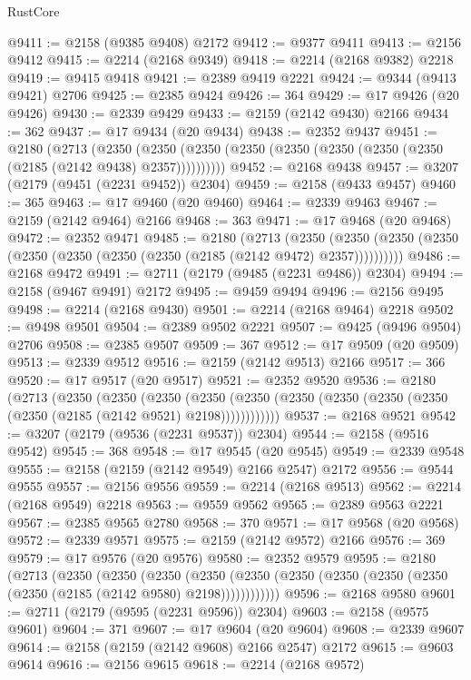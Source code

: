 \begin{lexlean}{RustCore}
\begin{coremodule}
@9411 := @2158 (@9385 @9408) @2172
@9412 := @9377 @9411
@9413 := @2156 @9412
@9415 := @2214 (@2168 @9349)
@9418 := @2214 (@2168 @9382) @2218
@9419 := @9415 @9418
@9421 := @2389 @9419 @2221
@9424 := @9344 (@9413 @9421) @2706
@9425 := @2385 @9424
@9426 := 364
@9429 := @17 @9426 (@20 @9426)
@9430 := @2339 @9429
@9433 := @2159 (@2142 @9430) @2166
@9434 := 362
@9437 := @17 @9434 (@20 @9434)
@9438 := @2352 @9437
@9451 := @2180
    (@2713
      (@2350 (@2350 (@2350 (@2350 (@2350 (@2350 (@2350 (@2350 (@2185 (@2142 @9438) @2357))))))))))
@9452 := @2168 @9438
@9457 := @3207 (@2179 (@9451 (@2231 @9452)) @2304)
@9459 := @2158 (@9433 @9457)
@9460 := 365
@9463 := @17 @9460 (@20 @9460)
@9464 := @2339 @9463
@9467 := @2159 (@2142 @9464) @2166
@9468 := 363
@9471 := @17 @9468 (@20 @9468)
@9472 := @2352 @9471
@9485 := @2180
    (@2713
      (@2350 (@2350 (@2350 (@2350 (@2350 (@2350 (@2350 (@2350 (@2185 (@2142 @9472) @2357))))))))))
@9486 := @2168 @9472
@9491 := @2711 (@2179 (@9485 (@2231 @9486)) @2304)
@9494 := @2158 (@9467 @9491) @2172
@9495 := @9459 @9494
@9496 := @2156 @9495
@9498 := @2214 (@2168 @9430)
@9501 := @2214 (@2168 @9464) @2218
@9502 := @9498 @9501
@9504 := @2389 @9502 @2221
@9507 := @9425 (@9496 @9504) @2706
@9508 := @2385 @9507
@9509 := 367
@9512 := @17 @9509 (@20 @9509)
@9513 := @2339 @9512
@9516 := @2159 (@2142 @9513) @2166
@9517 := 366
@9520 := @17 @9517 (@20 @9517)
@9521 := @2352 @9520
@9536 := @2180
    (@2713
      (@2350
        (@2350
          (@2350
            (@2350 (@2350 (@2350 (@2350 (@2350 (@2350 (@2350 (@2185 (@2142 @9521) @2198))))))))))))
@9537 := @2168 @9521
@9542 := @3207 (@2179 (@9536 (@2231 @9537)) @2304)
@9544 := @2158 (@9516 @9542)
@9545 := 368
@9548 := @17 @9545 (@20 @9545)
@9549 := @2339 @9548
@9555 := @2158 (@2159 (@2142 @9549) @2166 @2547) @2172
@9556 := @9544 @9555
@9557 := @2156 @9556
@9559 := @2214 (@2168 @9513)
@9562 := @2214 (@2168 @9549) @2218
@9563 := @9559 @9562
@9565 := @2389 @9563 @2221
@9567 := @2385 @9565 @2780
@9568 := 370
@9571 := @17 @9568 (@20 @9568)
@9572 := @2339 @9571
@9575 := @2159 (@2142 @9572) @2166
@9576 := 369
@9579 := @17 @9576 (@20 @9576)
@9580 := @2352 @9579
@9595 := @2180
    (@2713
      (@2350
        (@2350
          (@2350
            (@2350 (@2350 (@2350 (@2350 (@2350 (@2350 (@2350 (@2185 (@2142 @9580) @2198))))))))))))
@9596 := @2168 @9580
@9601 := @2711 (@2179 (@9595 (@2231 @9596)) @2304)
@9603 := @2158 (@9575 @9601)
@9604 := 371
@9607 := @17 @9604 (@20 @9604)
@9608 := @2339 @9607
@9614 := @2158 (@2159 (@2142 @9608) @2166 @2547) @2172
@9615 := @9603 @9614
@9616 := @2156 @9615
@9618 := @2214 (@2168 @9572)

\end{coremodule}
\end{lexlean}
